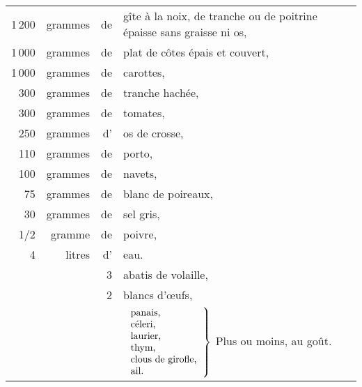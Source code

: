 \footnotesize
\begin{longtable}{rrrp{18em}}
 1 200 & grammes  & de & gîte à la noix, de tranche ou de poitrine épaisse sans graisse ni os,            \\
 1 000 & grammes  & de & plat de côtes épais et couvert,                                                  \\
 1 000 & grammes  & de & carottes,                                                                        \\
   300 & grammes  & de & tranche hachée,                                                                  \\
   300 & grammes  & de & tomates,                                                                         \\
   250 & grammes  & d' & os de crosse,                                                                    \\
   110 & grammes  & de & porto,                                                                           \\
   100 & grammes  & de & navets,                                                                          \\
    75 & grammes  & de & blanc de poireaux,                                                               \\
    30 & grammes  & de & sel gris,                                                                        \\
   1/2 & gramme   & de & poivre,                                                                          \\
     4 & litres   & d' & eau.                                                                             \\
       &          & 3  & abatis de volaille,                                                              \\
       &          & 2  & blancs d'œufs,                                                                   \\
\setlength\tabcolsep{.15em}
       &          &    &  $\left.                   
                               \begin{tabular}{lll} 
                                panais,               \\
                                céleri,               \\ 
                                laurier,              \\ 
                                thym,                 \\ 
                                clous de girofle,     \\ 
                                ail.                  \\ 
                               \end{tabular}        
                             \right\} $ Plus ou moins, au goût.
\end{longtable}
\normalsize 


